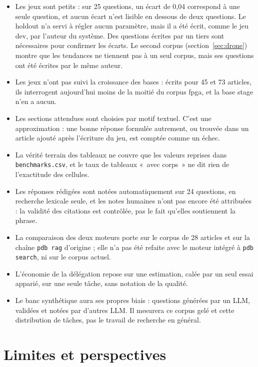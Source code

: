 \documentclass[11pt,a4paper]{article}
\newcommand{\cmd}[1]{\texttt{#1}}
\begin{document}
\begin{itemize}
  \item Les jeux sont petits : sur 25 questions, un écart de 0,04 correspond à une seule
    question, et aucun écart n'est lisible en dessous de deux questions. Le holdout n'a servi
    à régler aucun paramètre, mais il a été écrit, comme le jeu dev, par l'auteur du système.
    Des questions écrites par un tiers sont nécessaires pour confirmer les écarts. Le second
    corpus (section~\ref{sec:drone}) montre que les tendances ne tiennent pas à un seul
    corpus, mais ses questions ont été écrites par le même auteur.
  \item Les jeux n'ont pas suivi la croissance des bases : écrits pour 45 et 73 articles,
    ils interrogent aujourd'hui moins de la moitié du corpus fpga, et la base stage n'en a
    aucun.
  \item Les sections attendues sont choisies par motif textuel. C'est une approximation : une
    bonne réponse formulée autrement, ou trouvée dans un article ajouté après l'écriture du
    jeu, est comptée comme un échec.
  \item La vérité terrain des tableaux ne couvre que les valeurs reprises dans
    \cmd{benchmarks.csv}, et le taux de tableaux «~avec corps~» ne dit rien de l'exactitude
    des cellules.
  \item Les réponses rédigées sont notées automatiquement sur 24 questions, en recherche
    lexicale seule, et les notes humaines n'ont pas encore été attribuées : la validité des
    citations est contrôlée, pas le fait qu'elles soutiennent la phrase.
  \item La comparaison des deux moteurs porte sur le corpus de 28 articles et sur la chaîne
    \cmd{pdb rag} d'origine ; elle n'a pas été refaite avec le moteur intégré à
    \cmd{pdb search}, ni sur le corpus actuel.
  \item L'économie de la délégation repose sur une estimation, calée par un seul essai
    apparié, sur une seule tâche, sans notation de la qualité.
  \item Le banc synthétique aura ses propres biais : questions générées par un LLM, validées
    et notées par d'autres LLM. Il mesurera ce corpus gelé et cette distribution de tâches,
    pas le travail de recherche en général.
\end{itemize}

\section{Limites et perspectives}
\end{document}
